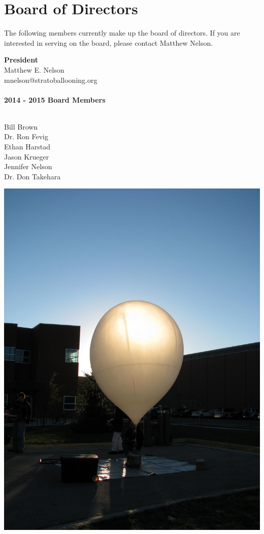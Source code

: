 \documentclass[10pt,foldmark,notumble]{leaflet}
\begin{document}
\section{Board of Directors}
The following members currently make up the board of directors.  If you are interested in serving on the board, please contact Matthew Nelson.
\begin{center}
{\bf President} \ \\
Matthew E. Nelson\ \\
mnelson@stratoballooning.org \ \\ \ \\

{\bf 2014 - 2015 Board Members}\ \\ \ \\
\begin{multicols}{2}
Bill Brown  \ \\ Dr. Ron Fevig \ \\ Ethan Harstad \ \\ Jason Krueger \ \\ Jennifer Nelson \ \\ Dr. Don Takehara
\end{multicols}

\includegraphics[scale=.23]{images/IMG_0826.jpg}

\end{center}
\end{document}
